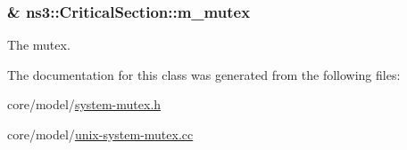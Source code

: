\subsubsection[{\texorpdfstring{m\+\_\+mutex}{m_mutex}}]{\& ns3\+::\+Critical\+Section\+::m\+\_\+mutex\hspace{0.3cm}{\ttfamily [private]}}\hypertarget{classns3_1_1CriticalSection_a083af9071caca5a2a4c5dd8aa60516d4}{}\label{classns3_1_1CriticalSection_a083af9071caca5a2a4c5dd8aa60516d4}
The mutex. 

The documentation for this class was generated from the following files\+:\begin{DoxyCompactItemize}
\item 
core/model/\hyperlink{system-mutex_8h}{system-\/mutex.\+h}\item 
core/model/\hyperlink{unix-system-mutex_8cc}{unix-\/system-\/mutex.\+cc}\end{DoxyCompactItemize}

